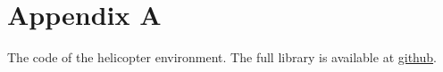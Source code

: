 \appendix

\section*{Appendix A} \label{appendix1}
The code of the helicopter environment. The full library is available at \href{https://github.com/MKamyab1991/sac_helicopter.git}{github}.




